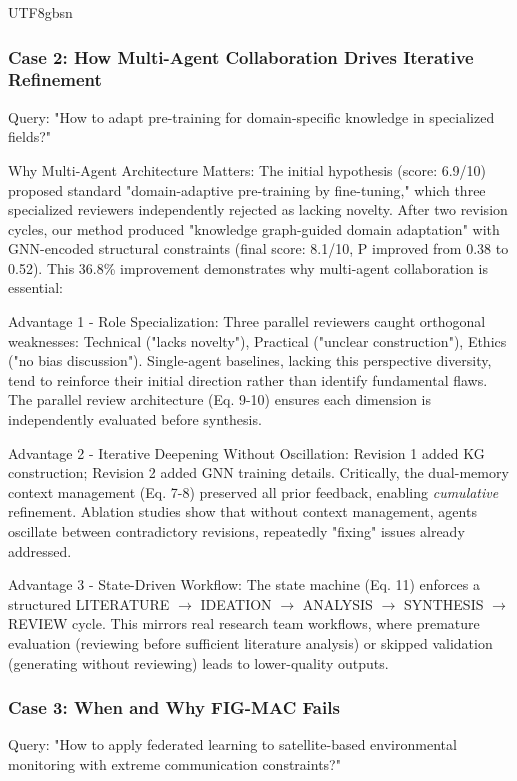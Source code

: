 \documentclass[11pt]{article}
\begin{document}
\begin{CJK}{UTF8}{gbsn}
\subsubsection{Case 2: How Multi-Agent Collaboration Drives Iterative Refinement}
\label{sec:case2}

Query: "How to adapt pre-training for domain-specific knowledge in specialized fields?"

Why Multi-Agent Architecture Matters: The initial hypothesis (score: 6.9/10) proposed standard "domain-adaptive pre-training by fine-tuning," which three specialized reviewers independently rejected as lacking novelty. After two revision cycles, our method produced "knowledge graph-guided domain adaptation" with GNN-encoded structural constraints (final score: 8.1/10, P improved from 0.38 to 0.52). This 36.8\% improvement demonstrates why multi-agent collaboration is essential:

Advantage 1 - Role Specialization: Three parallel reviewers caught orthogonal weaknesses: Technical ("lacks novelty"), Practical ("unclear construction"), Ethics ("no bias discussion"). Single-agent baselines, lacking this perspective diversity, tend to reinforce their initial direction rather than identify fundamental flaws. The parallel review architecture (Eq. 9-10) ensures each dimension is independently evaluated before synthesis.

Advantage 2 - Iterative Deepening Without Oscillation: Revision 1 added KG construction; Revision 2 added GNN training details. Critically, the dual-memory context management (Eq. 7-8) preserved all prior feedback, enabling \emph{cumulative} refinement. Ablation studies show that without context management, agents oscillate between contradictory revisions, repeatedly "fixing" issues already addressed.

Advantage 3 - State-Driven Workflow: The state machine (Eq. 11) enforces a structured LITERATURE $\rightarrow$ IDEATION $\rightarrow$ ANALYSIS $\rightarrow$ SYNTHESIS $\rightarrow$ REVIEW cycle. This mirrors real research team workflows, where premature evaluation (reviewing before sufficient literature analysis) or skipped validation (generating without reviewing) leads to lower-quality outputs.

\subsubsection{Case 3: When and Why FIG-MAC Fails}
\label{sec:case3}

Query: "How to apply federated learning to satellite-based environmental monitoring with extreme communication constraints?"


\end{CJK}
\end{document}

